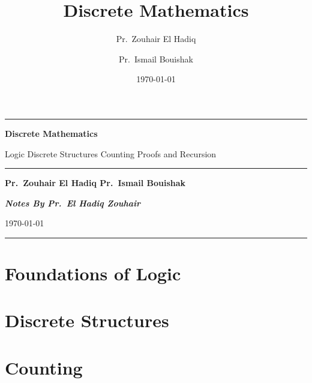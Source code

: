 \documentclass[11pt,twoside,openany]{book}
\title{Discrete Mathematics}
\author{Pr.\ Zouhair El Hadiq \and Pr.\ Ismail Bouishak}
\date{\today}
\begin{document}
\begin{titlepage}
\centering
\vspace*{2.5cm}
{\color{Orange}\rule{\linewidth}{2.5pt}}\par\vspace{1.2cm}
{\Huge\bfseries\color{DarkBlue} Discrete Mathematics\par}
\vspace{0.6cm}
{\Large\color{DarkBlue} Logic \textbullet{} Discrete Structures \textbullet{} Counting \textbullet{} Proofs and Recursion\par}
\vspace{1.2cm}
{\color{Orange}\rule{0.5\linewidth}{1.2pt}}\par\vspace{1.4cm}
{\large\bfseries Pr.\ Zouhair El Hadiq \quad\textbullet\quad Pr.\ Ismail Bouishak\par}
\vspace{0.8cm}
{\itshape\bfseries\color{Orange} Notes By Pr.\ El Hadiq Zouhair\par}
\vfill
{\large \today\par}
\vspace{1cm}
{\color{Orange}\rule{\linewidth}{2.5pt}}
\end{titlepage}

\frontmatter
\tableofcontents

\mainmatter

\part{Foundations of Logic}






\part{Discrete Structures}





\part{Counting}


\end{document}

